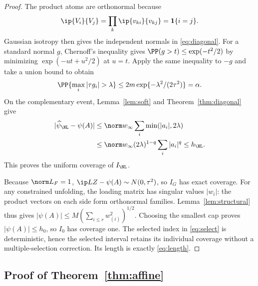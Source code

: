 \begin{proof}
The product atoms are orthonormal because
\[
 \ip{V_i}{V_j}=\prod_k\ip{v_{ki}}{v_{kj}}=\mathbf1\{i=j\}.
\]
Gaussian isotropy then gives the independent normals in \eqref{eq:diagonal}. For a standard normal $g$, Chernoff's inequality gives $\PP(g>t)\le\exp(-t^2/2)$ by minimizing $\exp(-ut+u^2/2)$ at $u=t$. Apply the same inequality to $-g$ and take a union bound to obtain
\[
 \PP\{\max_i|\tau g_i|>\lambda\}
 \le2m\exp\{-\lambda^2/(2\tau^2)\}=\alpha.
\]
On the complementary event, Lemma~\ref{lem:soft} and Theorem~\ref{thm:diagonal} give
\begin{align*}
 |\widehat\psi_{\NL}-\psi(A)|
 &\le\norm w_\infty\sum_i\min(|a_i|,2\lambda)\\
 &\le\norm w_\infty(2\lambda)^{1-q}\sum_i|a_i|^q\le h_{\NL}.
\end{align*}
This proves the uniform coverage of $I_{\NL}$.

Because $\norm L_F=1$, $\ip LZ-\psi(A)\sim N(0,\tau^2)$, so $I_G$ has exact coverage. For any constrained unfolding, the loading matrix has singular values $|w_i|$: the product vectors on each side form orthonormal families. Lemma~\ref{lem:structural} thus gives $|\psi(A)|\le M(\sum_{i\le r}w_{(i)}^2)^{1/2}$. Choosing the smallest cap proves $|\psi(A)|\le h_0$, so $I_0$ has coverage one. The selected index in \eqref{eq:select} is deterministic, hence the selected interval retains its individual coverage without a multiple-selection correction. Its length is exactly \eqref{eq:length}.
\end{proof}

\subsection{Proof of Theorem~\ref{thm:affine}}

